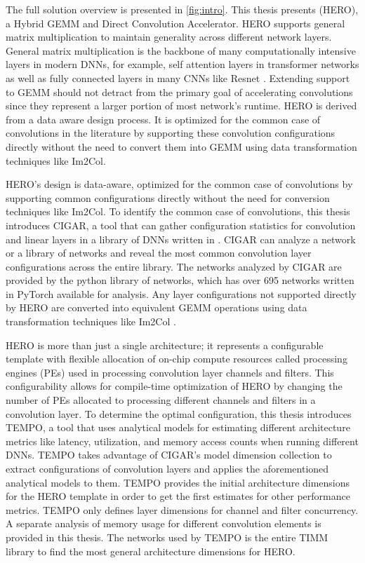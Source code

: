 The full solution overview is presented in \autoref{fig:intro}. This thesis
presents (HERO), a Hybrid GEMM and Direct Convolution Accelerator.  
HERO supports general matrix multiplication to maintain generality across
different network layers. General matrix multiplication is the backbone of many
computationally intensive layers in modern DNNs, for example, self attention
layers in transformer networks \cite{transformer_model} as well as fully
connected layers in many CNNs like Resnet \cite{resnet}. Extending support to
GEMM should not detract from the primary goal of accelerating convolutions since
they represent a larger portion of most network's runtime.  
HERO is derived from a data aware design process. It is optimized for the common
case of convolutions in the literature by supporting these convolution
configurations directly without the need to convert them into GEMM using data
transformation techniques like Im2Col.


HERO's design is data-aware, optimized for the common case of convolutions by
supporting common configurations directly without the need for conversion
techniques like Im2Col. To identify the common case of convolutions, this thesis
introduces CIGAR, a tool that can gather configuration statistics for
convolution and linear layers in a library of DNNs written in \cite{pytorch}. CIGAR can
analyze a network or a library of networks and reveal the most common
convolution layer configurations across the entire library. The networks
analyzed by CIGAR are provided by the \cite{timm} python library of networks, which has
over 695 networks written in PyTorch available for analysis. Any layer configurations
not supported directly by HERO are converted into equivalent GEMM operations
using data transformation techniques like Im2Col
\cite{cafe_con_troll}.


HERO is more than just a single architecture; it represents a configurable
template with flexible allocation of on-chip compute resources called processing
engines (PEs) used in processing convolution layer channels and filters. This
configurability allows for compile-time optimization of HERO by changing the
number of PEs allocated to processing different channels and filters in a
convolution layer. To determine the optimal configuration, this thesis
introduces TEMPO, a tool that uses analytical models for estimating different
architecture metrics like latency, utilization, and memory access counts when
running different DNNs. TEMPO takes advantage of CIGAR's model dimension
collection to extract configurations of convolution layers and applies the
aforementioned analytical models to them. TEMPO provides the initial
architecture dimensions for the HERO template in order to get the first
estimates for other performance metrics. TEMPO only defines layer dimensions for
channel and filter concurrency. A separate analysis of memory usage for
different convolution elements is provided in this thesis. The networks  used by
TEMPO is the entire TIMM library to find the most general architecture
dimensions for HERO.


